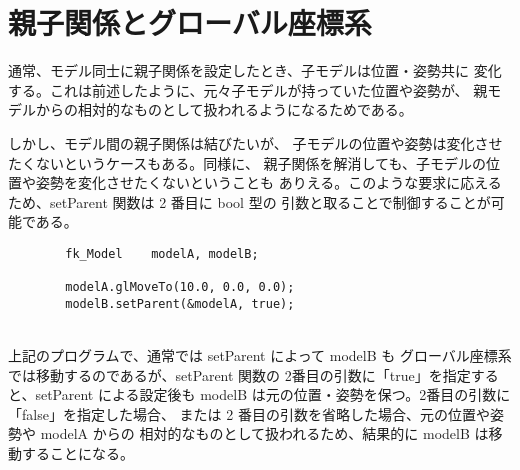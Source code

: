 \section{親子関係とグローバル座標系} \label{sec:modelglobal}
通常、モデル同士に親子関係を設定したとき、子モデルは位置・姿勢共に
変化する。これは前述したように、元々子モデルが持っていた位置や姿勢が、
親モデルからの相対的なものとして扱われるようになるためである。

しかし、モデル間の親子関係は結びたいが、
子モデルの位置や姿勢は変化させたくないというケースもある。同様に、
親子関係を解消しても、子モデルの位置や姿勢を変化させたくないということも
ありえる。このような要求に応えるため、setParent 関数は 2 番目に bool 型の
引数と取ることで制御することが可能である。
\\
\begin{breakbox}
\begin{verbatim}
        fk_Model    modelA, modelB;

        modelA.glMoveTo(10.0, 0.0, 0.0);
        modelB.setParent(&modelA, true);
\end{verbatim}
\end{breakbox}
~ \\
上記のプログラムで、通常では setParent によって modelB も
グローバル座標系では移動するのであるが、setParent 関数の
2番目の引数に「true」を指定すると、setParent による設定後も
modelB は元の位置・姿勢を保つ。2番目の引数に「false」を指定した場合、
または 2 番目の引数を省略した場合、元の位置や姿勢や modelA からの
相対的なものとして扱われるため、結果的に modelB は移動することになる。

